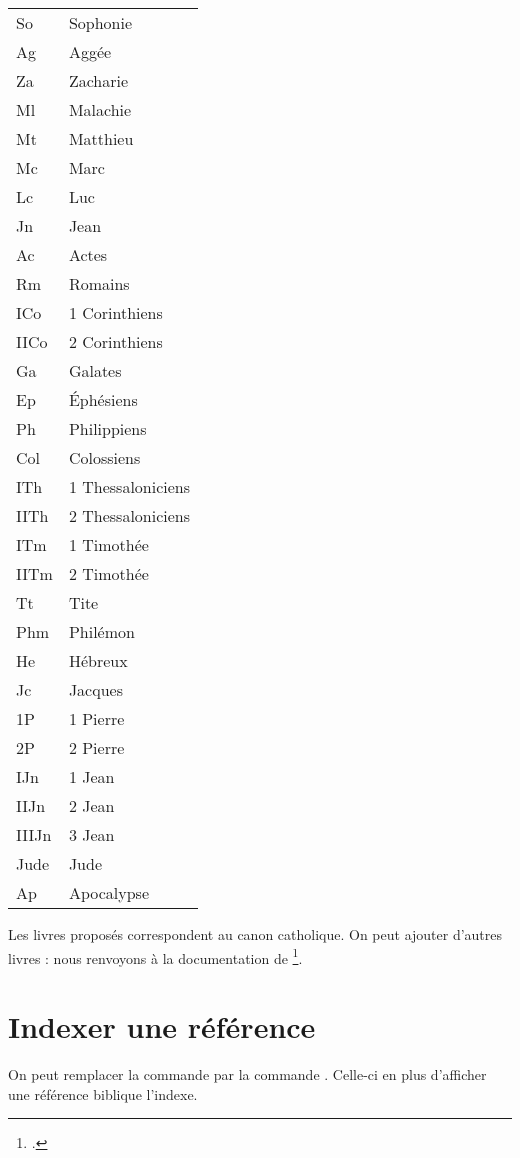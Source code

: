 \begin{longtable}{|l|l|}
So	&	Sophonie\\
Ag	&	Aggée\\
Za	&	Zacharie\\
Ml	&	Malachie\\
Mt	&	Matthieu\\
Mc	&	Marc\\
Lc	&	Luc\\
Jn	&	Jean\\
Ac	&	Actes\\
Rm	&	Romains\\
ICo	&	1 Corinthiens\\
IICo	&	2 Corinthiens\\
Ga	&	Galates\\
Ep	&	Éphésiens\\
Ph	&	Philippiens\\
Col	&	Colossiens\\
ITh	&	1 Thessaloniciens\\
IITh	&	2 Thessaloniciens\\
ITm	&	1 Timothée\\
IITm	&	2 Timothée\\
Tt	&	Tite\\
Phm	&	Philémon\\
He	&	Hébreux\\
Jc	&	Jacques\\
1P	&	1 Pierre\\
2P	&	2 Pierre\\
IJn	&	1 Jean\\
IIJn	&	2 Jean\\
IIIJn	&	3 Jean\\
Jude	&	Jude\\
Ap	&	Apocalypse\\
\end{longtable}

\begin{plusloins}
Les livres proposés correspondent au canon catholique. On peut ajouter d'autres livres : nous renvoyons à la documentation de \footcite{bibleref_nouveauxlivres}.


\end{plusloins}

\section{Indexer une référence}

On peut remplacer la commande  par la commande . Celle-ci en plus d'afficher une référence biblique l'indexe.

